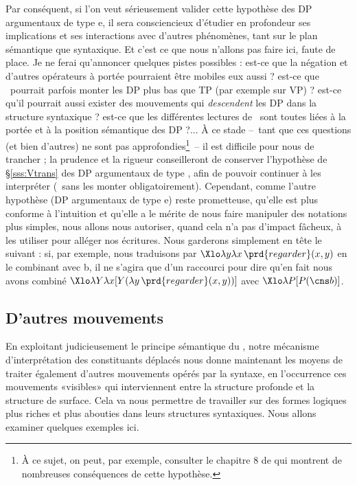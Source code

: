 Par conséquent, si l'on veut sérieusement valider cette hypothèse des DP argumentaux de type \typ e, il sera consciencieux d'étudier en profondeur ses implications et ses interactions avec d'autres phénomènes, tant sur le plan sémantique que syntaxique.  Et c'est ce que nous n'allons pas faire ici, faute de place.  
Je ne ferai qu'annoncer quelques pistes possibles : est-ce que la négation et d'autres opérateurs à portée pourraient être mobiles eux aussi ? est-ce que \QRa\ pourrait parfois monter les DP plus bas que TP (par exemple sur VP) ? est-ce qu'il pourrait aussi exister des mouvements qui \emph{descendent} les DP dans la structure syntaxique ? 
est-ce que les différentes lectures de \Last\ sont toutes liées à la portée et à la position sémantique des DP ?...
À ce stade --~tant que ces questions (et bien d'autres) ne sont pas approfondies\footnote{À ce sujet, on peut, par exemple, consulter le chapitre 8 de \citet{HeimKratzer:97} qui montrent de nombreuses conséquences de cette hypothèse.}~-- il est difficile pour nous de trancher ; la prudence et la rigueur conseilleront de conserver l'hypothèse de \S\ref{sss:Vtrans} des DP argumentaux de type \ett, afin de pouvoir continuer à les interpréter  (\ie\ sans les monter obligatoirement).
Cependant, comme l'autre hypothèse (DP argumentaux de type \typ e) reste prometteuse, qu'elle est plus conforme à l'intuition et qu'elle a le mérite de nous faire manipuler des notations plus simples, nous allons nous autoriser, quand cela n'a pas d'impact fâcheux, à les utiliser  pour alléger nos écritures.  
Nous garderons simplement en tête le  suivant : si, par exemple, nous traduisons  par $\Xlo\lambda y\lambda x\,\prd{regarder}(x,y)$ en le combinant avec \cns b, il ne s'agira que d'un raccourci pour dire qu'en fait nous avons combiné  $\Xlo\lambda Y\lambda x[Y(\lambda y\,\prd{regarder}(x,y))]$ avec $\Xlo\lambda P[P(\cns b)]$.



\subsection{D'autres mouvements}
\label{sss:xMontees}


En exploitant judicieusement le principe sémantique du ,
notre mécanisme d'interprétation des constituants déplacés nous donne maintenant les moyens de traiter également d'autres mouvements opérés par la syntaxe, en l'occurrence ces mouvements «visibles» qui interviennent entre la structure profonde et la structure de surface. 
Cela va nous permettre de travailler sur des formes logiques plus riches et plus abouties dans leurs structures syntaxiques.
Nous allons examiner quelques exemples ici.

